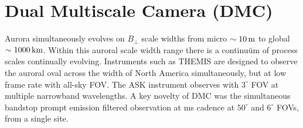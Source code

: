 \section{Dual Multiscale Camera (DMC)}\label{sec:dmc}
Aurora simultaneously evolves on $B_\perp$ scale widths from micro $\sim \unit[10]{m}$ to global $\sim \unit[1000]{km}$.
Within this auroral scale width range there is a continuüm of process scales continually evolving.
Instruments such as THEMIS are designed to observe the auroral oval across the width of North America simultaneously, but at low frame rate with all-sky FOV.
The ASK instrument observes with $3^\circ$ FOV at multiple narrowband wavelengths.
A key novelty of DMC was the simultaneous bandstop prompt emission filtered observation at \unit[33]{ms} cadence at $50^\circ$ and $6^\circ$ FOVs, from a single site.

